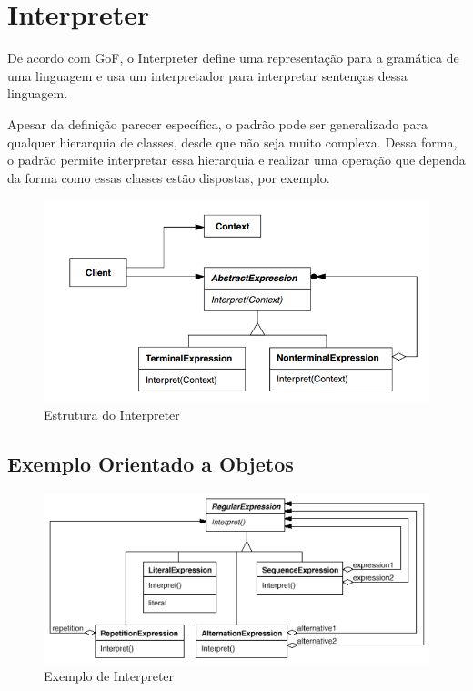 \section{Interpreter}

De acordo com GoF, o Interpreter define uma representação para 
a gramática de uma linguagem e usa um interpretador para 
interpretar sentenças dessa linguagem.

Apesar da definição parecer específica, o padrão pode ser 
generalizado para qualquer hierarquia de classes, desde que 
não seja muito complexa. Dessa forma, o padrão permite 
interpretar essa hierarquia e realizar uma operação que 
dependa da forma como essas classes estão dispostas, por 
exemplo.

\begin{figure}[htb]
	\caption{\label{interpreter_struct}Estrutura do Interpreter}
	\begin{center}
	    \includegraphics[scale=0.5]{5_padroes-contexto-funcional/5.3_comportamentais/5.3.03_interpreter/diagram.png}
	\end{center}
\end{figure}

\subsection*{Exemplo Orientado a Objetos}

\begin{figure}[htb]
	\caption{\label{interpreter_exemplo}Exemplo de Interpreter}
	\begin{center}
	    \includegraphics[scale=0.5]{5_padroes-contexto-funcional/5.3_comportamentais/5.3.03_interpreter/interpreter_exemplo.png}
	\end{center}
\end{figure}

